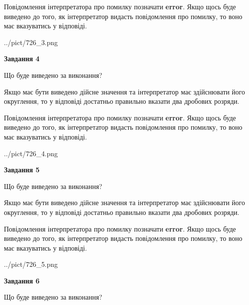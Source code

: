 \documentclass[12pt, ukrainian]{article}
\begin{document}
{\begin {Large}
Повідомлення інтерпретатора про помилку позначати \textbf{error}.
Якщо щось буде виведено до того, як інтерпретатор видасть повідомлення про помилку, 
то воно має вказуватись у відповіді. \par

\begin{center}
	{../pict/726_3.png}
\end{center}
\newpage

{\begin {center}\textbf{Завдання 4}\end {center}}\par
Що буде виведено за виконання? \par

Якщо має бути виведено дійсне значення та інтерпретатор має здійснювати його округлення, 
то у відповіді достатньо правильно вказати два дробових розряди.

Повідомлення інтерпретатора про помилку позначати \textbf{error}.
Якщо щось буде виведено до того, як інтерпретатор видасть повідомлення про помилку, 
то воно має вказуватись у відповіді. \par

\begin{center}
	{../pict/726_4.png}
\end{center}
\newpage

{\begin {center}\textbf{Завдання 5}\end {center}}\par
Що буде виведено за виконання? \par

Якщо має бути виведено дійсне значення та інтерпретатор має здійснювати його округлення, 
то у відповіді достатньо правильно вказати два дробових розряди.

Повідомлення інтерпретатора про помилку позначати \textbf{error}.
Якщо щось буде виведено до того, як інтерпретатор видасть повідомлення про помилку, 
то воно має вказуватись у відповіді. \par

\begin{center}
	{../pict/726_5.png}
\end{center}
\newpage

{\begin {center}\textbf{Завдання 6}\end {center}}\par
Що буде виведено за виконання? \par


\end{Large}}
\end{document}
